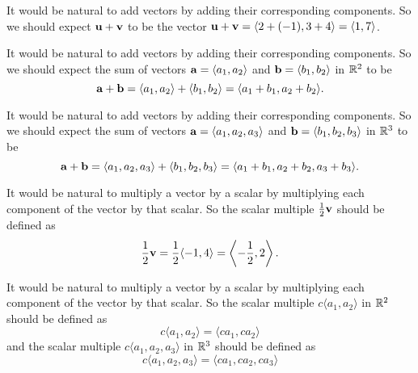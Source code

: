 \begin{activitySolution}
   \ba
    \item It would be natural to add vectors by adding their corresponding components. So we should expect $\mathbf{u} + \mathbf{v}$ to be the vector $\mathbf{u}+\mathbf{v} = \langle 2+(-1), 3+4 \rangle = \langle 1, 7\rangle$. 
    \item It would be natural to add vectors by adding their corresponding components. So we should expect the sum of vectors $\mathbf{a} = \langle a_1, a_2 \rangle$ and $\mathbf{b} = \langle b_1, b_2 \rangle$ in $\mathbb{R}^2$ to be
\[\mathbf{a} + \mathbf{b} =  \langle a_1, a_2 \rangle + \langle b_1, b_2 \rangle = \langle a_1+b_1, a_2+b_2 \rangle.\]
    \item It would be natural to add vectors by adding their corresponding components. So we should expect the sum of vectors $\mathbf{a} = \langle a_1, a_2, a_3 \rangle$ and $\mathbf{b} = \langle b_1, b_2, b_3 \rangle$ in $\mathbb{R}^3$ to be
\[\mathbf{a} + \mathbf{b} =  \langle a_1, a_2, a_3 \rangle + \langle b_1, b_2, b_3 \rangle = \langle a_1+b_1, a_2+b_2, a_3+b_3 \rangle.\]
    \item It would be natural to multiply a vector by a scalar by multiplying each component of the vector by that scalar. So the scalar multiple $\frac{1}{2}\mathbf{v}$ should be defined as 
\[\frac{1}{2}\mathbf{v} = \frac{1}{2}\langle -1, 4 \rangle = \left\langle -\frac{1}{2}, 2 \right\rangle.\]
    \item It would be natural to multiply a vector by a scalar by multiplying each component of the vector by that scalar. So the scalar multiple $c\langle a_1, a_2 \rangle$ in $\mathbb{R}^2$ should be defined as 
\[c\langle a_1, a_2 \rangle = \langle ca_1, ca_2 \rangle\]
and the scalar multiple $c\langle a_1, a_2, a_3 \rangle$ in $\mathbb{R}^3$ should be defined as 
\[c\langle a_1, a_2, a_3 \rangle = \langle ca_1, ca_2, ca_3 \rangle\]
    \ea
\end{activitySolution}
\aftera
